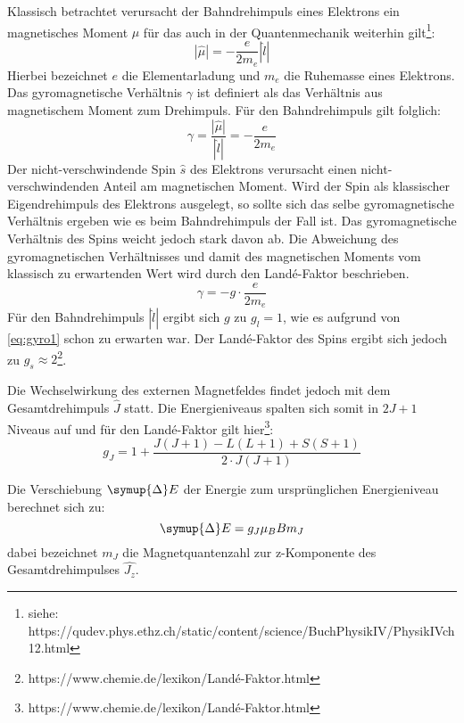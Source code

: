 Klassisch betrachtet verursacht der Bahndrehimpuls eines Elektrons ein magnetisches Moment $\mu$ für das auch in der Quantenmechanik weiterhin gilt\footnote{siehe: https://qudev.phys.ethz.ch/static/content/science/BuchPhysikIV/PhysikIVch12.html}:
\begin{equation}
|\hat{\mu}| = - \frac{e}{2m_e} |\hat{l}|
\end{equation}
Hierbei bezeichnet $e$ die Elementarladung und $m_e$ die Ruhemasse eines Elektrons.
Das gyromagnetische Verhältnis $\gamma$ ist definiert als das Verhältnis aus magnetischem Moment zum Drehimpuls. Für den Bahndrehimpuls gilt folglich:
\begin{equation}
\gamma = \frac{|\hat{\mu}|}{|\hat{l}|} = - \frac{e}{2m_e}
\label{eq:gyro1}
\end{equation}
Der nicht-verschwindende Spin $\hat{s}$ des Elektrons verursacht einen nicht-verschwindenden Anteil am magnetischen Moment.
Wird der Spin als klassischer Eigendrehimpuls des Elektrons ausgelegt, so sollte sich das selbe gyromagnetische Verhältnis ergeben wie es beim Bahndrehimpuls der Fall ist.
Das gyromagnetische Verhältnis des Spins weicht jedoch stark davon ab.
Die Abweichung des gyromagnetischen Verhältnisses und damit des magnetischen Moments vom klassisch zu erwartenden Wert wird durch den Landé-Faktor beschrieben.
\begin{equation}
\gamma = - g\cdot\frac{e}{2m_e}
\end{equation}
Für den Bahndrehimpuls $|\hat{l}|$ ergibt sich $g$ zu $g_l = 1$, wie es aufgrund von \autoref{eq:gyro1} schon zu erwarten war.
Der Landé-Faktor des Spins ergibt sich jedoch zu $g_s \approx 2$\footnote{https://www.chemie.de/lexikon/Landé-Faktor.html}.


Die Wechselwirkung des externen Magnetfeldes findet jedoch mit dem Gesamtdrehimpuls $\hat{J}$ statt.
Die Energieniveaus spalten sich somit in $2J+1$ Niveaus auf und für den Landé-Faktor gilt hier\footnote{https://www.chemie.de/lexikon/Landé-Faktor.html}:
\begin{equation}
g_J = 1+\frac{J(J+1) - L(L+1) + S(S+1)}{2 \cdot J(J+1)}
\label{eq:lande}
\end{equation}

Die Verschiebung $\symup{\Delta} E$ der Energie zum ursprünglichen Energieniveau berechnet sich zu:
\begin{equation}
\symup{\Delta} E = g_J \mu_B B m_J
\label{eq:anzeeman}
\end{equation}
dabei bezeichnet $m_J$ die Magnetquantenzahl zur z-Komponente des Gesamtdrehimpulses $\hat{J_z}$.




